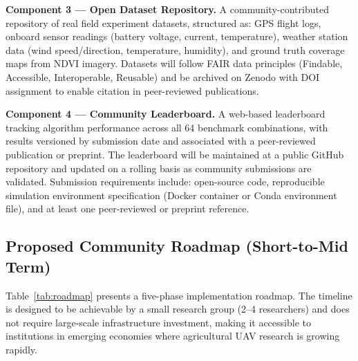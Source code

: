 \documentclass[review,3p,times]{elsarticle}
\begin{document}
\textbf{Component 3 --- Open Dataset Repository.} A community-contributed repository of real field experiment datasets, structured as: GPS flight logs, onboard sensor readings (battery voltage, current, temperature), weather station data (wind speed/direction, temperature, humidity), and ground truth coverage maps from NDVI imagery. Datasets will follow FAIR data principles (Findable, Accessible, Interoperable, Reusable) and be archived on Zenodo with DOI assignment to enable citation in peer-reviewed publications.

\textbf{Component 4 --- Community Leaderboard.} A web-based leaderboard tracking algorithm performance across all 64 benchmark combinations, with results versioned by submission date and associated with a peer-reviewed publication or preprint. The leaderboard will be maintained at a public GitHub repository and updated on a rolling basis as community submissions are validated. Submission requirements include: open-source code, reproducible simulation environment specification (Docker container or Conda environment file), and at least one peer-reviewed or preprint reference.

\subsection{Proposed Community Roadmap (Short-to-Mid Term)}

Table~\ref{tab:roadmap} presents a five-phase implementation roadmap. The timeline is designed to be achievable by a small research group (2--4 researchers) and does not require large-scale infrastructure investment, making it accessible to institutions in emerging economies where agricultural UAV research is growing rapidly.
\end{document}
